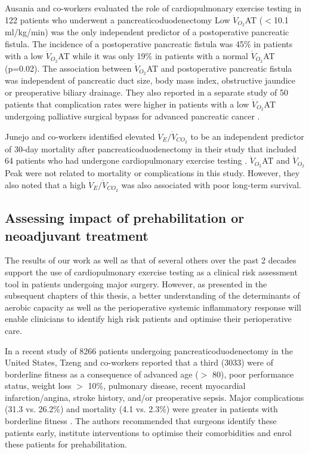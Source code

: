 Ausania and co-workers evaluated the role of cardiopulmonary exercise testing in 122 patients who underwent a pancreaticoduodenectomy \parencite{ausania_effects_2012}
Low $\dot{V}_{O_2}$AT ($<$10.1 ml/kg/min) was the only independent predictor of a postoperative pancreatic fistula.
The incidence of a postoperative pancreatic fistula was 45\% in patients with a low $\dot{V}_{O_2}$AT while it was only 19\% in patients with a normal $\dot{V}_{O_2}$AT (p=0.02).
The association between $\dot{V}_{O_2}$AT and postoperative pancreatic fistula was independent of pancreatic duct size, body mass index, obstructive jaundice or preoperative biliary drainage.
They also reported in a separate study of 50 patients that complication  rates were higher in patients with a low $\dot{V}_{O_2}$AT undergoing palliative surgical bypass for advanced pancreatic cancer \parencite{ausania_double_2012}.

Junejo and co-workers identified elevated $\dot{V}_E/\dot{V}_{CO_2}$ to be an independent predictor of 30-day mortality after pancreaticoduodenectomy in their study that included 64 patients who had undergone cardiopulmonary exercise testing \parencite{junejo_cardiopulmonary_2014}.
$\dot{V}_{O_2}$AT and $\dot{V}_{O_2}$Peak  were not related to mortality or complications in this study.
However, they also noted that a high $\dot{V}_E/\dot{V}_{CO_2}$ was also associated with poor long-term survival.

\subsection{Assessing impact of prehabilitation or neoadjuvant treatment}
The results of our work as well as that of several others over the past 2 decades support the use of cardiopulmonary exercise testing as a clinical risk assessment tool in patients undergoing major surgery.
However, as presented in the subsequent chapters of this thesis, a better understanding of the determinants of aerobic capacity as well as the perioperative systemic inflammatory response will enable clinicians to identify high risk patients and optimise their perioperative care.

In a recent study of 8266 patients undergoing pancreaticoduodenectomy in the United States, Tzeng and co-workers reported that a third (3033) were of borderline fitness as a consequence of advanced age ($>$ 80), poor performance status, weight loss $>$ 10\%, pulmonary disease, recent myocardial infarction/angina, stroke history, and/or preoperative sepsis. 
Major complications (31.3 vs. 26.2\%) and mortality (4.1 vs. 2.3\%) were greater in patients with borderline fitness \parencite{tzeng_morbidity_2014}.
The authors recommended that surgeons identify these patients early, institute interventions to optimise their comorbidities and enrol these patients for prehabilitation. 

